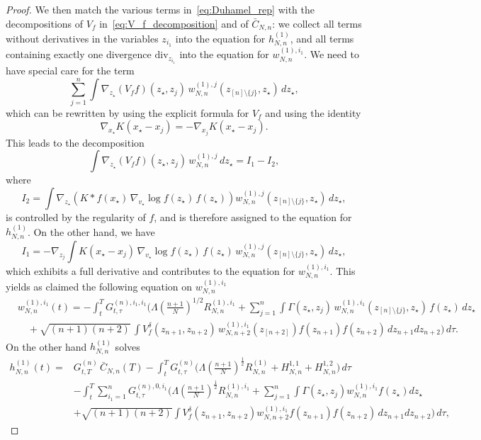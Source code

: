 \documentclass[pdflatex,sn-mathphys-num]{sn-jnl}
\theoremstyle{thmstyleone}%
\theoremstyle{thmstyletwo}%
\theoremstyle{thmstylethree}%
\begin{document}
\begin{proof}
\noindent
We then match the various terms in~\eqref{eq:Duhamel_rep} with the decompositions of \(V_f\) in~\eqref{eq:V_f_decomposition} and of $\bar C_{N,n}$: we collect all terms without derivatives
in the variables \(z_{i_1}\) into the equation for \(h^{(1)}_{N,n}\), and all terms
containing exactly one divergence \(\mathrm{div}_{z_{i_1}}\) into the equation
for \(w^{(1),i_1}_{N,n}\). We need to have special care for the term
\[
\sum_{j=1}^n \int \nabla_{z_\star}(V_f f)(z_\star,z_j)\,
w^{(1),j}_{N,n}(z_{[n]\setminus\{j\}}, z_\star)\,dz_\star,
\]
which can be rewritten by using the explicit formula for \(V_f\) and using the identity
\[
\nabla_{x_\star}K(x_\star-x_j)=-\nabla_{x_j}K(x_\star-x_j).
\]
This leads to the decomposition
\[
\int \nabla_{z_\star}(V_f f)(z_\star,z_j)\,
w^{(1),j}_{N,n}\,dz_\star
= I_1 - I_2,
\]
where
\[
I_2
=\int \nabla_{z_\star}
\!\left(K*f(x_\star)\,\nabla_{v_\star}\log f(z_\star)\,f(z_\star)\right)
w^{(1),j}_{N,n}(z_{[n]\setminus\{j\}}, z_\star)\,dz_\star,
\]
is controlled by the regularity of \(f\), and is therefore
assigned to the equation for \(h^{(1)}_{N,n}\).
On the other hand, we have
\[
I_1
=-\nabla_{z_j}
\int K(x_\star-x_j)\,
\nabla_{v_\star}\log f(z_\star)\,
f(z_\star)\,
w^{(1),j}_{N,n}(z_{[n]\setminus\{j\}}, z_\star)\,dz_\star,
\]
which exhibits a full derivative and contributes to the equation for \(w^{(1),i_1}_{N,n}\). This yields as claimed the following equation on $w_{N,n}^{(1),i_1}$
\[
\begin{aligned}
&w^{(1),i_1}_{N,n}(t)
= -\int_t^T G_{t,\tau}^{(n),i_1,i_1}\Big(
\Lambda\!\left(\tfrac{n+1}{N}\right)^{1/2}
R^{(1),i_1}_{N,n}
+ \sum_{j=1}^n \int \Gamma(z_\star,z_j)\,
w^{(1),i_1}_{N,n}(z_{[n]\setminus\{j\}}, z_\star)\,
f(z_\star)\,dz_\star \\
&\quad+ \sqrt{(n+1)(n+2)}\,
\int V_f^\delta(z_{n+1},z_{n+2})\,
w^{(1),i_1}_{N,n+2}(z_{[n+2]})
f(z_{n+1}) f(z_{n+2})\,dz_{n+1}dz_{n+2}\Big)\,d\tau.
\end{aligned}
\]
On the other hand $h^{(1)}_{N,n}$ solves
\[
\begin{aligned}
h^{(1)}_{N,n}(t)=&G_{t,T}^{(n)}\,\bar C_{N,n}(T)
 -\int_t^T G_{t,\tau}^{(n)} \Bigg(
\Lambda\!\left(\tfrac{n+1}{N}\right)^{\frac12} R^{(1)}_{N,n}
+H_{N,n}^{1,1}+H_{N,n}^{1,2} 
\Bigg)\,d\tau \\
&-\int_t^T \sum_{i_1=1}^n G_{t,\tau}^{(n),0,i_1} \Bigg(\Lambda\! \left( \tfrac{n+1}{N}\right)^{\frac{1}{2}}R_{N,n}^{(1),i_1} +  \sum_{j=1}^n \int \Gamma (z_\star,z_j) w^{(1),i_1}_{N,n} f(z_\star) dz_\star \\
&+ \sqrt{(n+1)(n+2)} \int V_f^{\delta} (z_{n+1}, z_{n+2}) w^{(1),i_1}_{N,n+2} f(z_{n+1}) f(z_{n+2})\,dz_{n+1}dz_{n+2} \Bigg) \, d\tau,

\end{aligned}\]
\end{proof}
\end{document}
